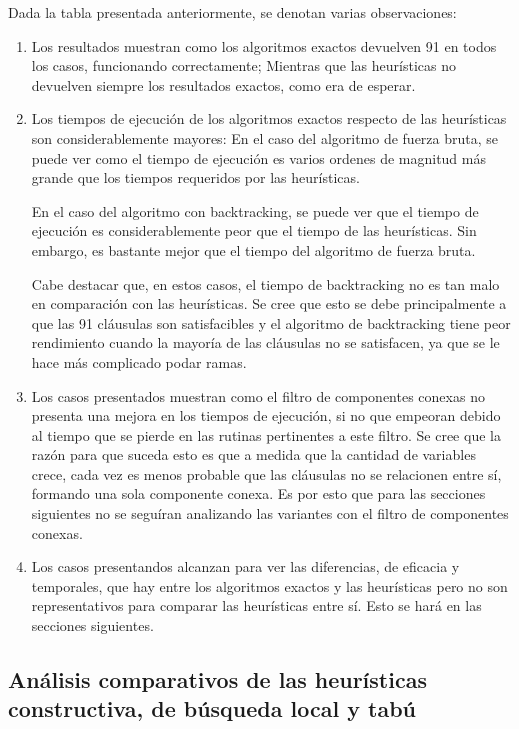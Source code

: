 \documentclass[a4paper,10pt]{article}
\begin{document}
Dada la tabla presentada anteriormente, se denotan varias observaciones:

\begin{enumerate}
\item Los resultados muestran como los algoritmos exactos devuelven 91 en todos los casos, funcionando correctamente; Mientras que las heur\'isticas no devuelven siempre los resultados exactos, como era de esperar.
\item Los tiempos de ejecuci\'on de los algoritmos exactos respecto de las heur\'isticas son considerablemente mayores: En el caso del algoritmo de fuerza bruta, se puede ver como el tiempo de ejecuci\'on es varios ordenes de magnitud m\'as grande que los tiempos requeridos por las heur\'isticas.

En el caso del algoritmo con backtracking, se puede ver que el tiempo de ejecuci\'on es considerablemente peor que el tiempo de las heur\'isticas. Sin embargo, es bastante mejor que el tiempo del algoritmo de fuerza bruta.

Cabe destacar que, en estos casos, el tiempo de backtracking no es tan malo en comparaci\'on con las heur\'isticas. Se cree que esto se debe principalmente a que las 91 cl\'ausulas son satisfacibles y el algoritmo de backtracking tiene peor rendimiento cuando la mayor\'ia de las cl\'ausulas no se satisfacen, ya que se le hace m\'as complicado podar ramas.
\item Los casos presentados muestran como el filtro de componentes conexas no presenta una mejora en los tiempos de ejecuci\'on, si no que empeoran debido al tiempo que se pierde en las rutinas pertinentes a este filtro. Se cree que la raz\'on para que suceda esto es que a medida que la cantidad de variables crece, cada vez es menos probable que las cl\'ausulas no se relacionen entre s\'i, formando una sola componente conexa. Es por esto que para las secciones siguientes no se segu\'iran analizando las variantes con el filtro de componentes conexas.
\item Los casos presentandos alcanzan para ver las diferencias, de eficacia y temporales, que hay entre los algoritmos exactos y las heur\'isticas pero no son representativos para comparar las heur\'isticas entre s\'i. Esto se har\'a en las secciones siguientes.
\end{enumerate}


\subsection*{An\'alisis comparativos de las heur\'isticas constructiva, de b\'usqueda local y tab\'u}
\end{document}
